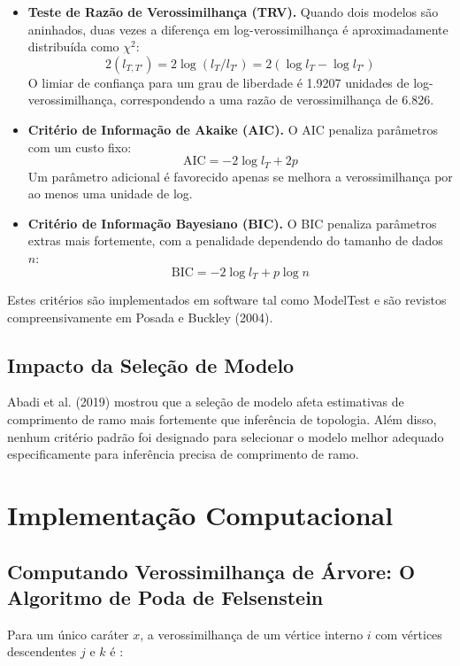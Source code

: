 \begin{itemize}
    \item \textbf{Teste de Razão de Verossimilhança (TRV).} Quando dois modelos são aninhados, duas vezes a diferença em log-verossimilhança é aproximadamente distribuída como $\chi^2$:
    $$2(l_{T,T'}) = 2\log(l_T / l_{T'}) = 2(\log l_T - \log l_{T'})$$
    O limiar de confiança para um grau de liberdade é 1.9207 unidades de log-verossimilhança, correspondendo a uma razão de verossimilhança de 6.826.

    \item \textbf{Critério de Informação de Akaike (AIC).} O AIC \parencite{akaike1974} penaliza parâmetros com um custo fixo:
    $$\mathrm{AIC} = -2\log l_T + 2p$$
    Um parâmetro adicional é favorecido apenas se melhora a verossimilhança por ao menos uma unidade de log.

    \item \textbf{Critério de Informação Bayesiano (BIC).} O BIC \parencite{schwarz1978} penaliza parâmetros extras mais fortemente, com a penalidade dependendo do tamanho de dados $n$:
    $$\mathrm{BIC} = -2\log l_T + p\log n$$
\end{itemize}

Estes critérios são implementados em software tal como ModelTest e são revistos compreensivamente em Posada e Buckley (2004).

\subsection{Impacto da Seleção de Modelo}

Abadi et al. (2019) mostrou que a seleção de modelo afeta estimativas de comprimento de ramo mais fortemente que inferência de topologia. Além disso, nenhum critério padrão foi designado para selecionar o modelo melhor adequado especificamente para inferência precisa de comprimento de ramo.

\section{Implementação Computacional}

\subsection{Computando Verossimilhança de Árvore: O Algoritmo de Poda de Felsenstein}

Para um único caráter $x$, a verossimilhança de um vértice interno $i$ com vértices descendentes $j$ e $k$ é \parencite{wheeler2012}:

